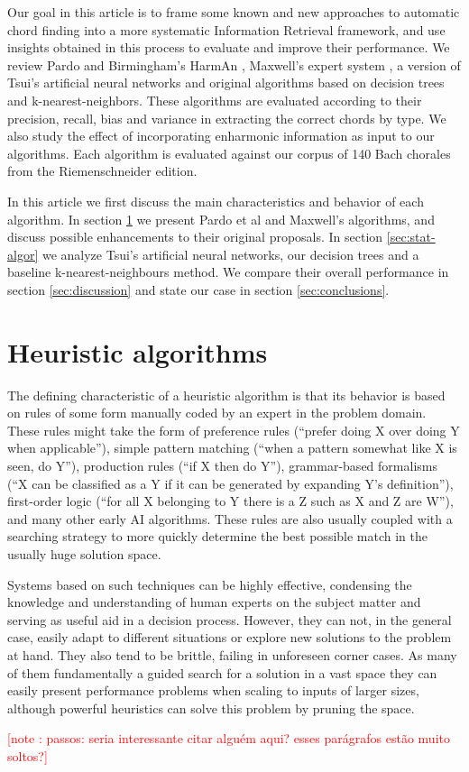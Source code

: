 \documentclass{article}
\newcounter{notecounter}
\newcommand{\note}[1]{
  \addtocounter{notecounter}{1}
  \textcolor{red}{[note \arabic{notecounter}: #1]}
}
\begin{document}
Our goal in this article is to frame some known and new approaches to
automatic chord finding into a more systematic Information Retrieval
framework, and use insights obtained in this process to evaluate and
improve their performance. We review Pardo and Birmingham's HarmAn
\cite{pardo.ea:automated}, Maxwell's expert system
\cite{maxwell:expert}, a version of Tsui's artificial neural networks
\cite{tsui:harmonic} and original algorithms based on decision trees
and k-nearest-neighbors. These algorithms are evaluated according to
their precision, recall, bias and variance in extracting the correct
chords by type. We also study the effect of incorporating enharmonic
information as input to our algorithms. Each algorithm is evaluated
against our corpus of 140 Bach chorales from the Riemenschneider
\cite{bach:371} edition.

In this article we first discuss the main characteristics and behavior
of each algorithm. In section \ref{sec:heuristic-algorithms} we
present Pardo et al and Maxwell's algorithms, and discuss possible
enhancements to their original proposals. In section
\ref{sec:stat-algor} we analyze Tsui's artificial neural networks, our
decision trees and a baseline k-nearest-neighbours method. We compare
their overall performance in section \ref{sec:discussion} and state
our case in section \ref{sec:conclusions}.


\section{Heuristic algorithms}
\label{sec:heuristic-algorithms}

The defining characteristic of a heuristic algorithm is that its
behavior is based on rules of some form manually coded by an expert in
the problem domain. These rules might take the form of preference
rules (``prefer doing X over doing Y when applicable''), simple
pattern matching (``when a pattern somewhat like X is seen, do Y''),
production rules (``if X then do Y''), grammar-based formalisms (``X
can be classified as a Y if it can be generated by expanding Y's
definition''), first-order logic (``for all X belonging to Y there is
a Z such as X and Z are W''), and many other early AI
algorithms. These rules are also usually coupled with a searching
strategy to more quickly determine the best possible match in the
usually huge solution space.

Systems based on such techniques can be highly effective, condensing
the knowledge and understanding of human experts on the subject matter
and serving as useful aid in a decision process. However, they can
not, in the general case, easily adapt to different situations or
explore new solutions to the problem at hand. They also tend to be
brittle, failing in unforeseen corner cases. As many of them
fundamentally a guided search for a solution in a vast space they can
easily present performance problems when scaling to inputs of larger
sizes, although powerful heuristics can solve this problem by pruning
the space. \note{passos: seria interessante citar alguém aqui? esses
  parágrafos estão muito soltos?}
\end{document}
